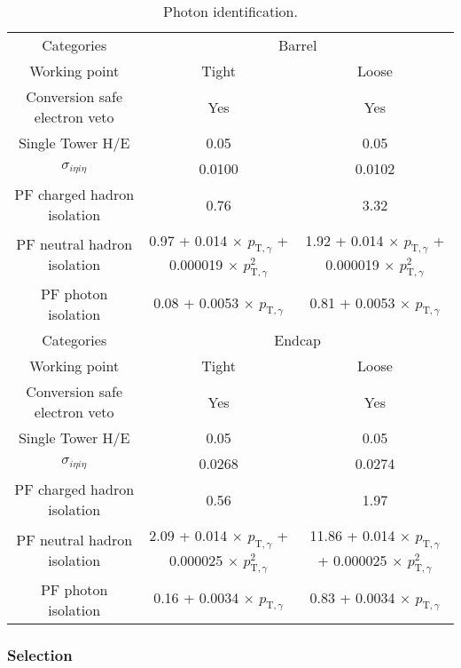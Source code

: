 \begin{table}[ht!]
  \caption{Photon identification.\label{tab:photon-id-gamma}}
  \centering
  \footnotesize
  \begin{tabular}{ ccc }
    \hline
    \hline
    Categories & \multicolumn{2}{c}{Barrel}   \\
    Working point  & Tight & Loose \\
    \hline
    Conversion safe electron veto & Yes & Yes  \\
    Single Tower H/E              & 0.05 & 0.05  \\
    $\sigma_{i\eta i\eta}$        & 0.0100 & 0.0102 \\
    PF charged hadron isolation   & 0.76 & 3.32  \\
    PF neutral hadron isolation   & 0.97 + 0.014 $\times$ $p_{\mathrm{T},\gamma}$ + 0.000019 $\times$ $p_{\mathrm{T},\gamma}^{2}$ & 1.92 + 0.014 $\times$ $p_{\mathrm{T},\gamma}$ + 0.000019 $\times$ $p_{\mathrm{T},\gamma}^{2}$  \\
    PF photon isolation           & 0.08 + 0.0053 $\times$ $p_{\mathrm{T},\gamma}$ & 0.81 + 0.0053 $\times$ $p_{\mathrm{T},\gamma}$ \\
    \hline
    \hline
    Categories & \multicolumn{2}{c}{Endcap}   \\
    Working point  & Tight & Loose \\
    \hline
    Conversion safe electron veto & Yes & Yes  \\
    Single Tower H/E              & 0.05 & 0.05  \\
    $\sigma_{i\eta i\eta}$        & 0.0268 & 0.0274 \\
    PF charged hadron isolation   & 0.56 & 1.97  \\
    PF neutral hadron isolation   & 2.09 + 0.014 $\times$ $p_{\mathrm{T},\gamma}$ + 0.000025 $\times$ $p_{\mathrm{T},\gamma}^{2}$ & 11.86 + 0.014 $\times$ $p_{\mathrm{T},\gamma}$ + 0.000025 $\times$ $p_{\mathrm{T},\gamma}^{2}$ \\
    PF photon isolation           &  0.16 + 0.0034 $\times$ $p_{\mathrm{T},\gamma}$ & 0.83 + 0.0034 $\times$ $p_{\mathrm{T},\gamma}$ \\
    \hline
    \hline
  \end{tabular}
  \end{table}

\subsubsection{Selection}

